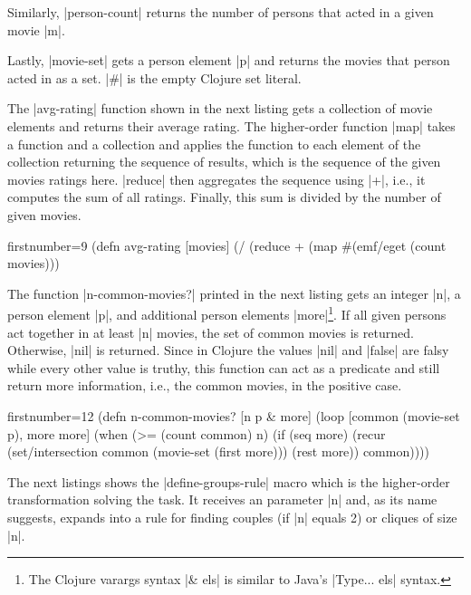 \documentclass[a4paper]{article}
\newcommand{\code}{\clojureinline}
\begin{document}
Similarly, \code|person-count| returns the number of persons that acted in a
given movie \code|m|.

Lastly, \code|movie-set| gets a person element \code|p| and returns the movies
that person acted in as a set.  \code|#{}| is the empty Clojure set literal.

The \code|avg-rating| function shown in the next listing gets a collection of
movie elements and returns their average rating.  The higher-order function
\code|map| takes a function and a collection and applies the function to each
element of the collection returning the sequence of results, which is the
sequence of the given movies ratings here.  \code|reduce| then aggregates the
sequence using \code|+|, i.e., it computes the sum of all ratings.  Finally,
this sum is divided by the number of given movies.

\begin{clojurecode*}{firstnumber=9}
(defn avg-rating [movies]
  (/ (reduce + (map #(emf/eget %
     (count movies)))
\end{clojurecode*}

The function \code|n-common-movies?| printed in the next listing gets an
integer \code|n|, a person element \code|p|, and additional person elements
\code|more|\footnote{The Clojure varargs syntax \code|& els| is similar to
  Java's \code|Type... els| syntax.}.  If all given persons act together in at
least \code|n| movies, the set of common movies is returned.  Otherwise,
\code|nil| is returned.  Since in Clojure the values \code|nil| and
\code|false| are falsy while every other value is truthy, this function can act
as a predicate and still return more information, i.e., the common movies, in
the positive case.

\begin{clojurecode*}{firstnumber=12}
(defn n-common-movies? [n p & more]
  (loop [common (movie-set p), more more]
    (when (>= (count common) n)
      (if (seq more)
        (recur (set/intersection common (movie-set (first more)))
               (rest more))
        common))))
\end{clojurecode*}

The next listings shows the \code|define-groups-rule| macro which is the
higher-order transformation solving the task.  It receives an parameter
\code|n| and, as its name suggests, expands into a rule for finding couples (if
\code|n| equals 2) or cliques of size \code|n|.
\end{document}
